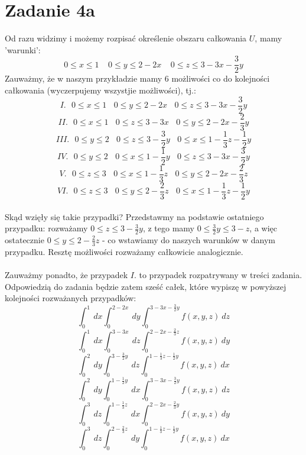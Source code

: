 \documentclass{article}
\begin{document}
\section*{Zadanie 4a}

Od razu widzimy i możemy rozpisać określenie obszaru całkowania $U$, mamy 'warunki':
$$0 \leq x \leq 1 \ \ \ \ \ 0 \leq y \leq 2-2x \ \ \ \ \ 0 \leq z \leq 3-3x-\frac{3}{2}y$$
Zauważmy, że w naszym przykładzie mamy 6 możliwości co do kolejności całkowania (wyczerpujemy wszystjie możliwości), tj.:
$$I.  \ \ \ 0 \leq x \leq 1 \ \ \ \ 0 \leq y \leq 2 - 2x \ \ \ \ 0 \leq z \leq 3 - 3x - \frac{3}{2}y$$
$$II.  \ \ \ 0 \leq x \leq 1 \ \ \ \ 0 \leq z \leq 3 - 3x \ \ \ \ 0 \leq y \leq 2 - 2x - \frac{2}{3}y$$
$$III.  \ \ \ 0 \leq y \leq 2 \ \ \ \ 0 \leq z \leq 3 - \frac{3}{2}y \ \ \ \ 0 \leq x \leq 1 - \frac{1}{3}z - \frac{1}{2}y$$
$$IV.  \ \ \ 0 \leq y \leq 2 \ \ \ \ 0 \leq x \leq 1 - \frac{1}{2}y \ \ \ \ 0 \leq z \leq 3 - 3x - \frac{3}{2}y$$
$$V.  \ \ \ 0 \leq z \leq 3 \ \ \ \ 0 \leq x \leq 1 - \frac{1}{3}z \ \ \ \ 0 \leq y \leq 2 - 2x - \frac{2}{3}z$$
$$VI.  \ \ \ 0 \leq z \leq 3 \ \ \ \ 0 \leq y \leq 2 - \frac{2}{3}z \ \ \ \ 0 \leq x \leq 1 - \frac{1}{3}z - \frac{1}{2}y$$ \\
Skąd wzięły się takie przypadki? Przedstawmy na podstawie ostatniego przypadku: rozważamy $0 \leq z \leq 3 - \frac{3}{2}y$, z tego mamy $0 \leq \frac{3}{2}y \leq 3-z $, a więc ostatecznie $0 \leq y \leq 2 - \frac{2}{3}z$ - co wstawiamy do naszych warunków w danym przypadku. Resztę możliwości rozważamy całkowicie analogicznie. \\ \\
Zauważmy ponadto, że przypadek $I.$ to przypadek rozpatrywany w treści zadania. Odpowiedzią do zadania będzie zatem sześć całek, które wypiszę w powyższej kolejności rozważanych przypadków:
$$\int_0 ^ {1} \ dx \int_0 ^ {2-2x} \ dy \int_0 ^{3-3x-\frac{3}{2}y} f(x,y,z) \ dz$$
$$\int_0 ^ {1} \ dx \int_0 ^ {3-3x} \ dz \int_0 ^{2-2x-\frac{2}{3}z} f(x,y,z) \ dy$$
$$\int_0 ^ {2} \ dy \int_0 ^ {3-\frac{3}{2}y} \ dz \int_0 ^{1 - \frac{1}{3}z - \frac{1}{2}y} f(x,y,z) \ dx$$
$$\int_0 ^ {2} \ dy \int_0 ^ {1 - \frac{1}{2}y} \ dx \int_0 ^{3-3x-\frac{3}{2}y} f(x,y,z) \ dz$$
$$\int_0 ^ {3} \ dz \int_0 ^ {1 - \frac{1}{3}z} \ dx \int_0 ^{2-2x-\frac{2}{3}y} f(x,y,z) \ dy$$
$$\int_0 ^ {3} \ dz \int_0 ^ {2 - \frac{2}{3}z} \ dy \int_0 ^{1-\frac{1}{3}z-\frac{1}{2}y} f(x,y,z) \ dx$$
\end{document}
